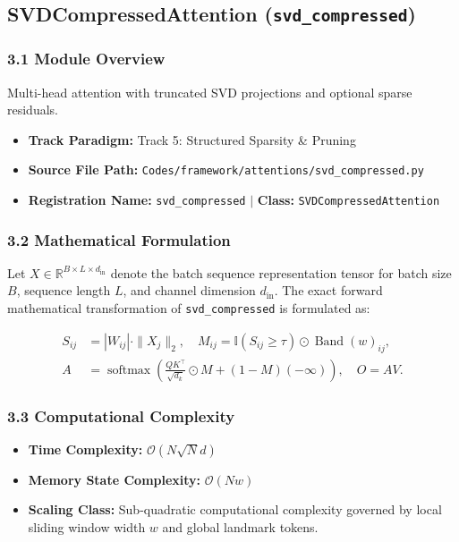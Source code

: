 \subsection{SVDCompressedAttention (\texttt{svd\_compressed})}
\label{sec:app_module_svd_compressed}

\subsubsection*{3.1 Module Overview}
Multi-head attention with truncated SVD projections and optional sparse residuals.
\begin{itemize}
    \item \textbf{Track Paradigm:} Track 5: Structured Sparsity \& Pruning
    \item \textbf{Source File Path:} \texttt{Codes/framework/attentions/svd\_compressed.py}
    \item \textbf{Registration Name:} \texttt{svd\_compressed} $\mid$ \textbf{Class:} \texttt{SVDCompressedAttention}
\end{itemize}

\subsubsection*{3.2 Mathematical Formulation}
Let $X \in \mathbb{R}^{B \times L \times d_{\text{in}}}$ denote the batch sequence representation tensor for batch size $B$, sequence length $L$, and channel dimension $d_{\text{in}}$. The exact forward mathematical transformation of \texttt{svd\_compressed} is formulated as:

\begin{align}
S_{ij} &= |W_{ij}| \cdot \|X_j\|_2, \quad M_{ij} = \mathbb{I}(S_{ij} \ge \tau) \odot \operatorname{Band}(w)_{ij}, \\
A &= \operatorname{softmax}\left(\frac{Q K^\top}{\sqrt{d_k}} \odot M + (1 - M)(-\infty)\right), \quad O = A V.
\end{align}


\subsubsection*{3.3 Computational Complexity}
\begin{itemize}
    \item \textbf{Time Complexity:} $\mathcal{O}(N \sqrt{N} d)$
    \item \textbf{Memory State Complexity:} $\mathcal{O}(N w)$
    \item \textbf{Scaling Class:} Sub-quadratic computational complexity governed by local sliding window width $w$ and global landmark tokens.
\end{itemize}

